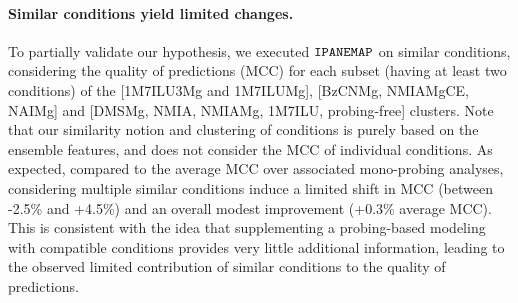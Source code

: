 \documentclass[a4,center,fleqn]{NAR}
\newcommand{\Software}[1]{$\text{\ttfamily #1}$}
\newcommand{\OurTool}{\Software{IPANEMAP}\xspace}
\begin{document}
\paragraph{Similar conditions yield limited changes.} To partially validate our hypothesis, we executed \OurTool{} on similar conditions, considering the quality of predictions (MCC) for each subset (having at least two conditions) of the [1M7ILU3Mg and 1M7ILUMg], [BzCNMg, NMIAMgCE, NAIMg] and [DMSMg, NMIA, NMIAMg, 1M7ILU, probing-free] clusters. Note that our similarity notion and clustering of conditions is purely based on the ensemble features, and does not consider the MCC of individual conditions.
As expected, compared to the average MCC over associated mono-probing analyses, 
considering multiple similar conditions induce a limited shift in MCC (between -2.5\% and +4.5\%) and an overall modest improvement (+0.3\% average MCC). This is consistent with the idea that supplementing a probing-based modeling with compatible conditions provides very little additional information, leading to the observed limited contribution of similar conditions to the quality of predictions.
\end{document}
